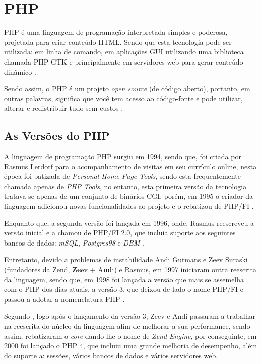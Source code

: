 \section{PHP}

\acs{PHP} é uma linguagem de programação interpretada simples e poderosa,
projetada para criar conteúdo \acs{HTML}. Sendo que esta tecnologia pode ser
utilizada: em linha de comando, em aplicações \ac{GUI} utilizando uma biblioteca
chamada \acs{PHP-GTK} e principalmente em servidores web para gerar conteúdo
dinâmico \cite{programmingPhp}.

Sendo assim, o \acs{PHP} é um projeto \textit{open source} (de código aberto),
portanto, em outras palavras, significa que você tem acesso ao código-fonte e
pode utilizar, alterar e redistribuir tudo sem custos \cite{phpAndMysqlWebDevelopment}.

\subsection{As Versões do PHP}

A linguagem de programação \acs{PHP} surgiu em 1994, sendo que, foi criada por
Rasmus Lerdorf para o acompanhamento de visitas em seu currículo online, nesta
época foi batizada de \textit{Personal Home Page Tools}, sendo esta
frequentemente chamada apenas de \textit{PHP Tools}, no entanto, esta primeira
versão da tecnologia tratava-se apenas de um conjunto de binários \ac{CGI},
porém, em 1995 o criador da linguagem adicionou novas funcionalidades ao projeto
e o rebatizou de \ac{PHP/FI} \cite{phpProgramandoComOrientacaoAObjetos}.

Enquanto que, a segunda versão foi lançada em 1996, onde, 
Rasmus reescreveu a versão inicial e a chamou de \acs{PHP/FI} 2.0, que incluia 
suporte aos seguintes bancos de dados: \textit{mSQL},
\textit{Postgres98} e \textit{DBM} \cite{programmingPhp}.

Entretanto, devido a problemas de instabilidade Andi Gutmans e Zeev
Suraski (fundadores da \acs{Zend}, \textbf{Ze}ev + A\textbf{nd}i) e Rasmus, em
1997 iniciaram outra reescrita da linguagem, sendo que, em 1998 foi lançada a versão
que mais se assemelha com o \acs{PHP} dos dias atuais, a versão 3, que deixou
de lado o nome \acs{PHP/FI} e passou a adotar a nomenclatura \ac{PHP}
\cite{websitePHPHistoria}.

Segundo , logo após o lançamento
da versão 3, Zeev e Andi passaram a trabalhar na reescrita do núcleo da 
linguagem afim de melhorar a sua performance, sendo assim, rebatizaram o
\textit{core} dando-lhe o nome de \textit{Zend Engine}, por conseguinte, em
2000 foi lançado o \acs{PHP} 4, que incluiu uma grande melhoria de desempenho, 
além do suporte a: sessões, vários bancos de dados e vários servidores web.


